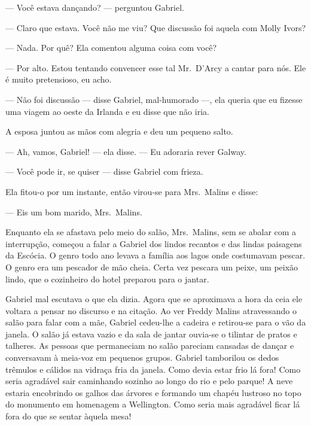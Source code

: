 --- Você estava dançando? --- perguntou Gabriel.

--- Claro que estava.  Você não me viu?  Que discussão foi aquela com Molly
Ivors?

--- Nada.  Por quê?  Ela comentou alguma coisa com você?

--- Por alto.  Estou tentando convencer esse tal Mr.~D’Arcy a cantar para nós.
Ele é muito pretensioso, eu acho.

--- Não foi discussão --- disse Gabriel, mal-humorado ---, ela queria que eu
fizesse uma viagem ao oeste da Irlanda e eu disse que não iria.

A esposa juntou as mãos com alegria e deu um pequeno salto.

--- Ah, vamos, Gabriel! --- ela disse.  --- Eu adoraria rever Galway.

--- Você pode ir, se quiser --- disse Gabriel com frieza.

Ela fitou-o por um instante, então virou-se para Mrs.~Malins e disse:

--- Eis um bom marido, Mrs.~Malins.

Enquanto ela se afastava pelo meio do salão, Mrs.~Malins, sem se abalar com a
interrupção, começou a falar a Gabriel dos lindos recantos e das lindas
paisagens da Escócia.  O genro todo ano levava a família aos lagos onde
costumavam pescar.  O genro era um pescador de mão cheia.  Certa vez pescara um
peixe, um peixão lindo, que o cozinheiro do hotel preparou para o jantar.

Gabriel mal escutava o que ela dizia.  Agora que se aproximava a hora da
ceia ele voltara a pensar no discurso e na citação.  Ao ver Freddy Malins
atravessando o salão para falar com a mãe, Gabriel cedeu-lhe a cadeira e
retirou-se para o vão da janela.  O salão já estava vazio e da sala de jantar
ouvia-se o tilintar de pratos e talheres.  As pessoas que permaneciam no salão
pareciam cansadas de dançar e conversavam à meia-voz em pequenos grupos.
Gabriel tamborilou os dedos trêmulos e cálidos na vidraça fria da janela.  Como
devia estar frio lá fora!  Como seria agradável sair caminhando sozinho ao
longo do rio e pelo parque!  A neve estaria encobrindo os galhos das árvores e
formando um chapéu lustroso no topo do monumento em homenagem a Wellington.
Como seria mais agradável ficar lá fora do que se sentar àquela mesa!

